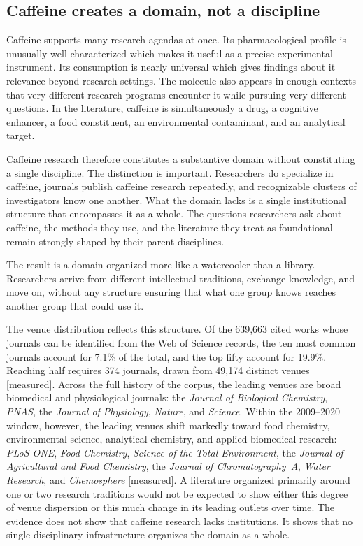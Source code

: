 \documentclass[11pt]{article}
\newcommand{\meas}{{\footnotesize\textsf{[measured]}}}
\begin{document}
\subsection{Caffeine creates a domain, not a discipline}

Caffeine supports many research agendas at once. Its pharmacological profile is unusually
well characterized which makes it useful as a precise experimental instrument. Its
consumption is nearly universal which gives findings about it relevance beyond research
settings. The molecule also appears in enough contexts that very different research
programs encounter it while pursuing very different questions. In the literature,
caffeine is simultaneously a drug, a cognitive enhancer, a food constituent, an
environmental contaminant, and an analytical target.

Caffeine research therefore constitutes a substantive domain without constituting a
single discipline. The distinction is important. Researchers do specialize in caffeine,
journals publish caffeine research repeatedly, and recognizable clusters of investigators
know one another. What the domain lacks is a single institutional structure that
encompasses it as a whole. The questions researchers ask about caffeine, the methods they
use, and the literature they treat as foundational remain strongly shaped by their
parent disciplines.

The result is a domain organized more like a watercooler than a library. Researchers
arrive from different intellectual traditions, exchange knowledge, and move on, without
any structure ensuring that what one group knows reaches another group that could use it.

The venue distribution reflects this structure. Of the 639{,}663 cited works whose
journals can be identified from the Web of Science records, the ten most common journals
account for 7.1\% of the total, and the top fifty account for 19.9\%. Reaching half
requires 374 journals, drawn from 49{,}174 distinct venues \meas{}. Across the full
history of the corpus, the leading venues are broad biomedical and physiological
journals: the \emph{Journal of Biological Chemistry}, \emph{PNAS}, the
\emph{Journal of Physiology}, \emph{Nature}, and \emph{Science}. Within the
2009--2020 window, however, the leading venues shift markedly toward food chemistry,
environmental science, analytical chemistry, and applied biomedical research:
\emph{PLoS ONE}, \emph{Food Chemistry}, \emph{Science of the Total Environment},
the \emph{Journal of Agricultural and Food Chemistry}, the
\emph{Journal of Chromatography~A}, \emph{Water Research}, and
\emph{Chemosphere} \meas{}. A literature organized primarily around one or two research
traditions would not be expected to show either this degree of venue dispersion or this
much change in its leading outlets over time. The evidence does not show that caffeine
research lacks institutions. It shows that no single disciplinary infrastructure
organizes the domain as a whole.
\end{document}
